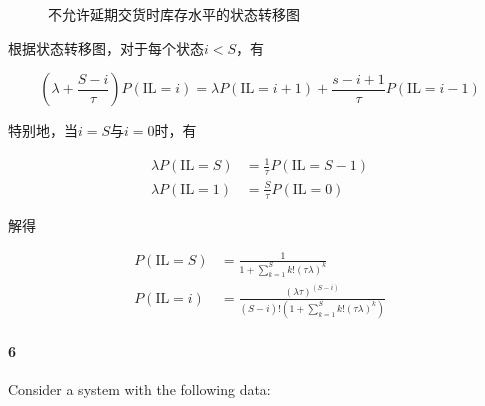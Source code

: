 \documentclass{../notes}
\begin{document}
\begin{subquestions}
\begin{figure}[h]

            \caption{不允许延期交货时库存水平的状态转移图}
            \label{fig:5-2}
        \end{figure}

        根据状态转移图，对于每个状态$i < S$，有

        \begin{equation}
            \left(\lambda + \frac{S-i}{\tau}\right)P(\mathrm{IL} = i) = \lambda P(\mathrm{IL} = i+1) + \frac{s - i + 1}{\tau}P(\mathrm{IL} = i-1)
        \end{equation}

        特别地，当$i=S$与$i=0$时，有

        \begin{equation}
            \begin{aligned}
                \lambda P(\mathrm {IL} = S) &= \frac{1}{\tau} P(\mathrm {IL} = S-1) \\
                \lambda P(\mathrm {IL} = 1) &= \frac{S}{\tau} P(\mathrm {IL} = 0)
            \end{aligned}
        \end{equation}

        解得

        \begin{equation}
            \begin{aligned}
                P(\mathrm {IL} = S) &= \frac{1}{1 + \sum_{k=1}^S k!(\tau\lambda)^k} \\
                P(\mathrm {IL} = i) &= \frac{(\lambda\tau)^{(S-i)}}{(S-i)!\left(1 + \sum_{k=1}^S k!(\tau\lambda)^k\right)}
            \end{aligned}
        \end{equation}
    \end{subquestions}

    \paragraph*{6} Consider a system with the following data:
\end{document}
